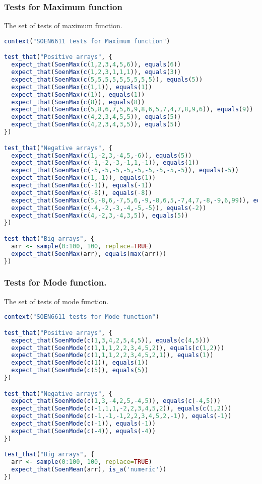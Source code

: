 \documentclass[12pt]{article}
\begin{document}
\subsubsection{Tests for Maximum function}
The set of tests of maximum function.
\begin{lstlisting}[language=R]
context("SOEN6611 tests for Maximum function")

test_that("Positive arrays", {
  expect_that(SoenMax(c(1,2,3,4,5,6)), equals(6))
  expect_that(SoenMax(c(1,2,3,1,1,1)), equals(3))
  expect_that(SoenMax(c(5,5,5,5,5,5,5,5,5)), equals(5))
  expect_that(SoenMax(c(1,1)), equals(1))
  expect_that(SoenMax(c(1)), equals(1))
  expect_that(SoenMax(c(8)), equals(8))
  expect_that(SoenMax(c(5,8,6,7,5,6,9,8,6,5,7,4,7,8,9,6)), equals(9))
  expect_that(SoenMax(c(4,2,3,4,5,5)), equals(5))
  expect_that(SoenMax(c(4,2,3,4,3,5)), equals(5))
})

test_that("Negative arrays", {
  expect_that(SoenMax(c(1,-2,3,-4,5,-6)), equals(5))
  expect_that(SoenMax(c(-1,-2,-3,-1,1,-1)), equals(1))
  expect_that(SoenMax(c(-5,-5,-5,-5,-5,-5,-5,-5,-5)), equals(-5))
  expect_that(SoenMax(c(1,-1)), equals(1))
  expect_that(SoenMax(c(-1)), equals(-1))
  expect_that(SoenMax(c(-8)), equals(-8))
  expect_that(SoenMax(c(5,-8,6,-7,5,6,-9,-8,6,5,-7,4,7,-8,-9,6,99)), equals(99))
  expect_that(SoenMax(c(-4,-2,-3,-4,-5,-5)), equals(-2))
  expect_that(SoenMax(c(4,-2,3,-4,3,5)), equals(5))
})

test_that("Big arrays", {
  arr <- sample(0:100, 100, replace=TRUE)
  expect_that(SoenMax(arr), equals(max(arr)))
})
\end{lstlisting}
\subsubsection{Tests for Mode function.}
The set of tests of mode function.
\begin{lstlisting}[language=R]
context("SOEN6611 tests for Mode function")

test_that("Positive arrays", {
  expect_that(SoenMode(c(1,3,4,2,5,4,5)), equals(c(4,5)))
  expect_that(SoenMode(c(1,1,1,2,2,3,4,5,2)), equals(c(1,2)))
  expect_that(SoenMode(c(1,1,1,2,2,3,4,5,2,1)), equals(1))
  expect_that(SoenMode(c(1)), equals(1))
  expect_that(SoenMode(c(5)), equals(5))
})

test_that("Negative arrays", {
  expect_that(SoenMode(c(1,3,-4,2,5,-4,5)), equals(c(-4,5)))
  expect_that(SoenMode(c(-1,1,1,-2,2,3,4,5,2)), equals(c(1,2)))
  expect_that(SoenMode(c(-1,-1,-1,2,2,3,4,5,2,-1)), equals(-1))
  expect_that(SoenMode(c(-1)), equals(-1))
  expect_that(SoenMode(c(-4)), equals(-4))
})

test_that("Big arrays", {
  arr <- sample(0:100, 100, replace=TRUE)
  expect_that(SoenMean(arr), is_a('numeric'))
})
\end{lstlisting}
\end{document}
